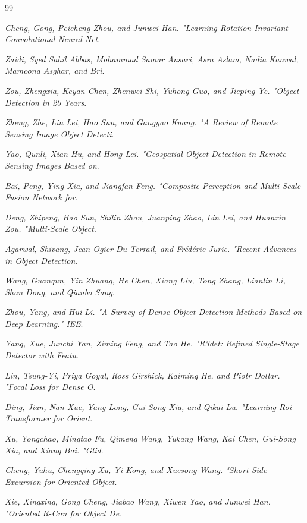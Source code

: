 \documentclass[journal]{IEEEtran}
\begin{document}
\begin{thebibliography}{99}

\textit{Cheng, Gong, Peicheng Zhou, and Junwei Han. "Learning Rotation-Invariant Convolutional Neural Net}.

\textit{Zaidi, Syed Sahil Abbas, Mohammad Samar Ansari, Asra Aslam, Nadia Kanwal, Mamoona Asghar, and Bri}.

\textit{Zou, Zhengxia, Keyan Chen, Zhenwei Shi, Yuhong Guo, and Jieping Ye. "Object Detection in 20 Years}.

\textit{Zheng, Zhe, Lin Lei, Hao Sun, and Gangyao Kuang. "A Review of Remote Sensing Image Object Detecti}.

\textit{Yao, Qunli, Xian Hu, and Hong Lei. "Geospatial Object Detection in Remote Sensing Images Based on}.

\textit{Bai, Peng, Ying Xia, and Jiangfan Feng. "Composite Perception and Multi-Scale Fusion Network for}.

\textit{Deng, Zhipeng, Hao Sun, Shilin Zhou, Juanping Zhao, Lin Lei, and Huanxin Zou. "Multi-Scale Object}.

\textit{Agarwal, Shivang, Jean Ogier Du Terrail, and Frédéric Jurie. "Recent Advances in Object Detection}.

\textit{Wang, Guanqun, Yin Zhuang, He Chen, Xiang Liu, Tong Zhang, Lianlin Li, Shan Dong, and Qianbo Sang}.

\textit{Zhou, Yang, and Hui Li. "A Survey of Dense Object Detection Methods Based on Deep Learning." IEE}.

\textit{Yang, Xue, Junchi Yan, Ziming Feng, and Tao He. "R3det: Refined Single-Stage Detector with Featu}.

\textit{Lin, Tsung-Yi, Priya Goyal, Ross Girshick, Kaiming He, and Piotr Dollar. "Focal Loss for Dense O}.

\textit{Ding, Jian, Nan Xue, Yang Long, Gui-Song Xia, and Qikai Lu. "Learning Roi Transformer for Orient}.

\textit{Xu, Yongchao, Mingtao Fu, Qimeng Wang, Yukang Wang, Kai Chen, Gui-Song Xia, and Xiang Bai. "Glid}.

\textit{Cheng, Yuhu, Chengqing Xu, Yi Kong, and Xuesong Wang. "Short-Side Excursion for Oriented Object}.

\textit{Xie, Xingxing, Gong Cheng, Jiabao Wang, Xiwen Yao, and Junwei Han. "Oriented R-Cnn for Object De}.


\end{thebibliography}
\end{document}
